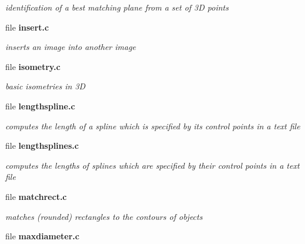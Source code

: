 \begin{DoxyCompactItemize}
\begin{DoxyCompactList}\small\item\em identification of a best matching plane from a set of 3D points \item\end{DoxyCompactList}

\item 
file {\bf insert.c}


\begin{DoxyCompactList}\small\item\em inserts an image into another image \item\end{DoxyCompactList}

\item 
file {\bf isometry.c}


\begin{DoxyCompactList}\small\item\em basic isometries in 3D \item\end{DoxyCompactList}

\item 
file {\bf lengthspline.c}


\begin{DoxyCompactList}\small\item\em computes the length of a spline which is specified by its control points in a text file \item\end{DoxyCompactList}

\item 
file {\bf lengthsplines.c}


\begin{DoxyCompactList}\small\item\em computes the lengths of splines which are specified by their control points in a text file \item\end{DoxyCompactList}

\item 
file {\bf matchrect.c}


\begin{DoxyCompactList}\small\item\em matches (rounded) rectangles to the contours of objects \item\end{DoxyCompactList}

\item 
file {\bf maxdiameter.c}



\end{DoxyCompactItemize}
